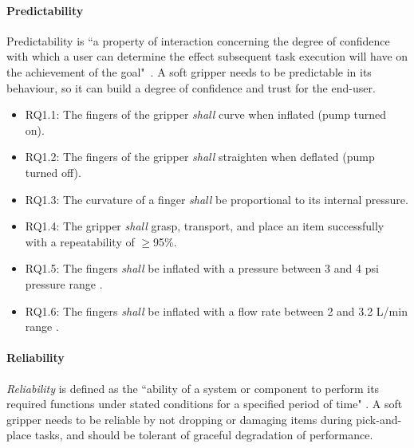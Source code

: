 \documentclass[letterpaper, 10 pt, conference]{ieeeconf}  %
\begin{document}
	\paragraph{\textbf{Predictability}}\label{predictability}
	Predictability is ``a property of interaction concerning the degree of confidence with which a user can determine the effect subsequent task execution will have on the achievement of the goal"~\cite{Abowd1991}. A soft gripper needs to be predictable in its behaviour, so it can build a degree of confidence and trust for the end-user.  
	\begin{itemize}
		\item RQ1.1: The fingers of the gripper \emph{shall} curve when inflated (pump turned on).  
		\item RQ1.2: The fingers of the gripper \emph{shall} straighten when deflated (pump turned off).  
		\item RQ1.3: The curvature of a finger \emph{shall} be proportional to its internal pressure. 
		\item RQ1.4: The gripper \emph{shall} grasp, transport, and place an item successfully with a repeatability of $\ge$95\%.
		\item RQ1.5: The fingers \emph{shall} be inflated with a pressure between 3 and 4 psi pressure range \cite{Partridge2022}. 
		\item RQ1.6: The fingers \emph{shall} be inflated with a flow rate between 2 and 3.2 L/min range \cite{DEWIN2022}.
	\end{itemize}
	
	\paragraph{\textbf{Reliability}}\label{reliability}
	\emph{Reliability} is defined as the ``ability of a system or component to perform its required functions under stated conditions for a specified period of time" \cite{ISO24765:2017}. A soft gripper needs to be reliable by not dropping or damaging items during pick-and-place tasks, and should be tolerant of graceful degradation of performance.
	
\end{document}
